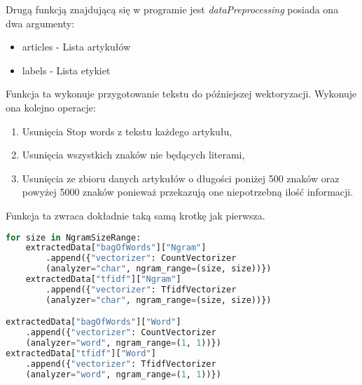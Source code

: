 Drugą funkcją znajdującą się w programie jest \textit{dataPreprocessing} posiada 
ona dwa argumenty:
\begin{itemize}
    \item articles - Lista artykułów
    \item labels - Lista etykiet
\end{itemize}
Funkcja ta wykonuje przygotowanie tekstu do późniejszej wektoryzacji. Wykonuje ona 
kolejno operacje:
\begin{enumerate}
    \item Usunięcia Stop words z tekstu każdego artykułu,
    \item Usunięcia wszystkich znaków nie będących literami,
    \item Usunięcia ze zbioru danych artykułów o długości poniżej 500 znaków oraz powyżej 5000 znaków 
    ponieważ przekazują one niepotrzebną ilość informacji.
\end{enumerate}
Funkcja ta zwraca dokładnie taką samą krotkę jak pierwsza.
\begin{lstlisting}[language=Python, caption={Tworzenie wektoryzatorów dzielących tekst na różnej długości ngramy}, captionpos=b, frame=single]
for size in NgramSizeRange:
    extractedData["bagOfWords"]["Ngram"]
        .append({"vectorizer": CountVectorizer
        (analyzer="char", ngram_range=(size, size))})
    extractedData["tfidf"]["Ngram"]
        .append({"vectorizer": TfidfVectorizer
        (analyzer="char", ngram_range=(size, size))})

extractedData["bagOfWords"]["Word"]
    .append({"vectorizer": CountVectorizer
    (analyzer="word", ngram_range=(1, 1))})
extractedData["tfidf"]["Word"]
    .append({"vectorizer": TfidfVectorizer
    (analyzer="word", ngram_range=(1, 1))})

\end{lstlisting}
